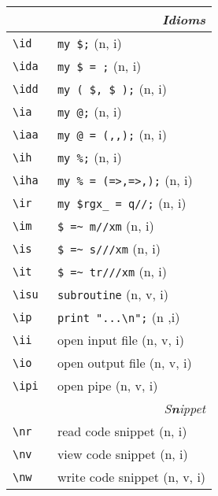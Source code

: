\documentclass[oneside,10pt,landscape,DIV17]{scrartcl}
\begin{document}
\begin{multicols}{3}
\begin{center}
\begin{tabular}[]{|p{11mm}|p{60mm}|}
\hline
\hline
\multicolumn{2}{|r|}{\textsl{\textbf{I}dioms}}                 \\[1.0ex]
\hline \verb'\id  '  & \verb'my $;'              \hfill (n, i)   \\
\hline \verb'\ida '  & \verb'my $ = ;'           \hfill (n, i)   \\
\hline \verb'\idd '  & \verb'my ( $, $ );'       \hfill (n, i)   \\
\hline \verb'\ia  '  & \verb'my @;'              \hfill (n, i)   \\
\hline \verb'\iaa '  & \verb'my @ = (,,);'       \hfill (n, i)   \\
\hline \verb'\ih  '  & \verb'my %;'              \hfill (n, i)   \\
\hline \verb'\iha '  & \verb'my % = (=>,=>,);'   \hfill (n, i)   \\
%
\hline \verb'\ir'  & \verb'my $rgx_ = q//;'    \hfill (n, i)   \\
\hline \verb'\im'  & \verb'$ =~ m//xm'         \hfill (n, i)   \\
\hline \verb'\is'  & \verb'$ =~ s///xm'        \hfill (n, i)   \\
\hline \verb'\it'  & \verb'$ =~ tr///xm'       \hfill (n, i)   \\
\hline \verb'\isu' & \verb'subroutine'         \hfill (n, v, i)\\
\hline \verb'\ip'  & \verb'print "...\n";'     \hfill (n ,i)   \\
\hline \verb'\ii'  & open input file           \hfill (n, v, i)\\
\hline \verb'\io'  & open output file          \hfill (n, v, i)\\
\hline \verb'\ipi' & open pipe                 \hfill (n, v, i)\\
\hline
\hline
\multicolumn{2}{|r|}{\textsl{S\textbf{n}ippet}}                \\[1.0ex]
\hline \verb'\nr'  & read code snippet         \hfill (n, i)   \\
\hline \verb'\nv'  & view code snippet         \hfill (n, i)   \\
\hline \verb'\nw'  & write code snippet        \hfill (n, v, i)\\

\end{tabular}
\end{center}
\end{multicols}
\end{document}
